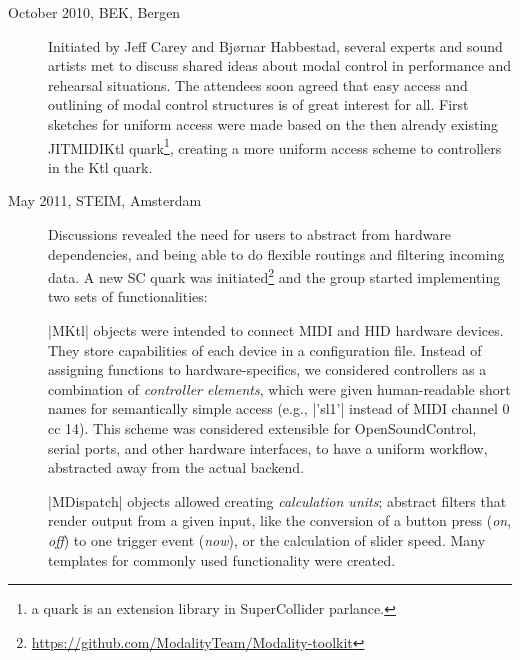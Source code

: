 \documentclass{article}
\newcommand{\todo}[1] {\emph{\textbf{TODO:} #1}}
\begin{document}
\begin{description}
	\item[October 2010, BEK, Bergen] Initiated by Jeff Carey and Bj\o{}rnar Habbestad, several experts and sound artists met to discuss shared ideas about modal control in performance and rehearsal situations.
	The attendees soon agreed that easy access and outlining of modal control structures is of great interest for all. First sketches for uniform access were made based on the then already existing JITMIDIKtl quark\footnote{a quark is an extension library in SuperCollider parlance.}, creating a more uniform access scheme to controllers in the Ktl quark. 
	
	
	\item[May 2011, STEIM, Amsterdam] Discussions revealed the need for users to abstract from hardware dependencies, and being able to do flexible routings and filtering incoming data. 
	A new SC quark was initiated\footnote{\url{https://github.com/ModalityTeam/Modality-toolkit}} and the group started implementing two sets of functionalities:

	|MKtl| objects were intended to connect MIDI and HID hardware devices. 
	They store capabilities of each device in a configuration file. 
	Instead of assigning functions to hardware-specifics, we considered controllers as a combination of \emph{controller elements}, which were given human-readable short names for semantically simple access (e.g., |'sl1'| instead of MIDI channel 0 cc 14).
This scheme was considered extensible for OpenSoundControl, serial ports, and other hardware interfaces, to have a uniform workflow, abstracted away from the actual backend.

|MDispatch| objects allowed creating \emph{calculation units}; abstract filters that render output from a given input, like the conversion of a button press (\emph{on}, \emph{off}) to one trigger event (\emph{now}), or the calculation of slider speed. Many templates for commonly used functionality were created.


\end{description}
\end{document}
